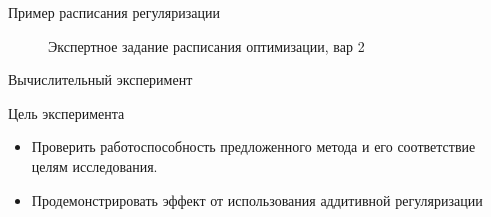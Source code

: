 \documentclass[9pt,pdf,hyperref={unicode}]{beamer}
\begin{document}
\begin{frame}{Пример расписания регуляризации}
\begin{figure}[h!]
\caption{Экспертное задание расписания оптимизации, вар 2}
\label{fig:opt schedule 2}
\end{figure}
\end{frame}

\begin{frame}{Вычислительный эксперимент}
\begin{block}{Цель эксперимента}
    \begin{itemize}
        \item Проверить работоспособность предложенного метода и его соответствие целям исследования.
        \item Продемонстрировать эффект от использования аддитивной регуляризации
    \end{itemize}
\end{block}

\end{frame}
\end{document}
